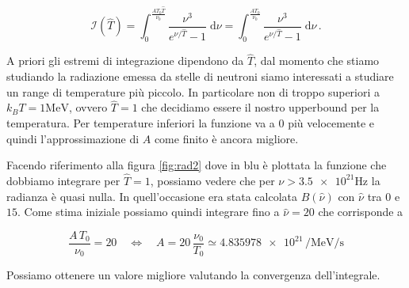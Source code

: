 \documentclass[a4paper, titlepage]{article}
\begin{document}
\begin{equation}
    \mathcal{I} (\hat T) = \int_0^{\frac{A T_0 \hat T}{\nu_0}} \frac{\nu^3}{e^{\nu / \hat T} - 1} \; \mathrm{d} \nu 
    = \int_0^{\frac{A T_0}{\nu_0}} \frac{\nu^3}{e^{\nu / \hat T} - 1} \; \mathrm{d} \nu \, .
    \label{eq:integrale}
\end{equation}

A priori gli estremi di integrazione dipendono da $\hat T$, dal momento che stiamo studiando la radiazione emessa da stelle di neutroni siamo interessati a studiare un range di temperature più piccolo.
In particolare non di troppo superiori a $k_B T = 1 \unit{\mega\electronvolt}$, ovvero $\hat T = 1$ che decidiamo essere il nostro upperbound per la temperatura.
Per temperature inferiori la funzione va a 0 più velocemente e quindi l'approssimazione di $A$ come finito è ancora migliore.

Facendo riferimento alla figura \ref{fig:rad2} dove in blu è plottata la funzione che dobbiamo integrare per $\hat T = 1$, possiamo vedere che per $\nu > \num{3.5e21} \unit{\hertz}$ la radianza è quasi nulla.
In quell'occasione era stata calcolata $\hat B(\hat \nu)$ con $\hat \nu$ tra $0$ e $15$. Come stima iniziale possiamo quindi integrare fino a $\hat \nu = 20$ che corrisponde a

\begin{equation}
    \frac{A \, T_0}{\nu_0} = 20
    \quad \iff \quad
    A = 20 \, \frac{\nu_0}{T_0} \simeq \num{4.835978e21} \, \unit{\per\mega\electronvolt\per\second}
    \label{eq:A}
\end{equation}

Possiamo ottenere un valore migliore valutando la convergenza dell'integrale.
\end{document}
